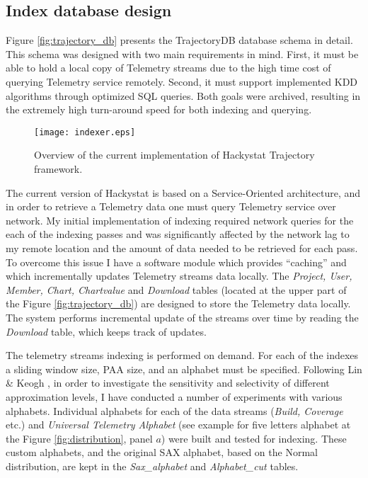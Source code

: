 \subsection{Index database design} \label{indexing_design}
Figure \ref{fig:trajectory_db} presents the TrajectoryDB database schema in detail. This schema was designed with two main requirements in mind. First, it must be able to hold a local copy of Telemetry streams due to the high time cost of querying Telemetry service remotely. Second, it must support implemented KDD algorithms through optimized SQL queries. Both goals were archived, resulting in the extremely high turn-around speed for both indexing and querying.

\begin{figure}[tbp]
   \centering
   \texttt{[image: indexer.eps]}
   \caption{Overview of the current implementation of Hackystat Trajectory framework.}
   \label{fig:indexer}
\end{figure}

The current version of Hackystat is based on a Service-Oriented architecture, and in order to retrieve a Telemetry data one must query Telemetry service over network. My initial implementation of indexing required network queries for the each of the indexing passes and was significantly affected by the network lag to my remote location and the amount of data needed to be retrieved for each pass. To overcome this issue I have a software module which provides ``caching'' and which incrementally updates Telemetry streams data locally. The \textit{Project, User, Member, Chart, Chartvalue} and \textit{Download} tables (located at the upper part of the Figure \ref{fig:trajectory_db}) are designed to store the Telemetry data locally. The system performs incremental update of the streams over time by reading the \textit{Download} table, which keeps track of updates.

The telemetry streams indexing is performed on demand. For each of the indexes a sliding window size, PAA size, and an alphabet must be specified. Following Lin \& Keogh \cite{citeulike:2821475}, in order to investigate the sensitivity and selectivity of different approximation levels, I have conducted a number of experiments with various alphabets. Individual alphabets for each of the data streams (\textit{Build, Coverage} etc.) and \textit{Universal Telemetry Alphabet} (see example for five letters alphabet at the Figure \ref{fig:distribution}, panel $a$) were built and tested for indexing. These custom alphabets, and the original SAX alphabet, based on the Normal distribution, are kept in the \textit{Sax\_alphabet} and \textit{Alphabet\_cut} tables. 

